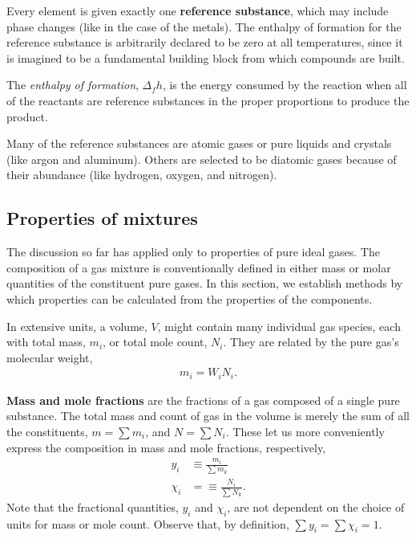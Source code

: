 Every element is given exactly one {\bf reference substance}, which may include phase changes (like in the case of the metals).  The enthalpy of formation for the reference substance is arbitrarily declared to be zero at all temperatures, since it is imagined to be a fundamental building block from which compounds are built.

The \emph{enthalpy of formation}, $\Delta_f h$, is the energy consumed by the reaction when all of the reactants are reference substances in the proper proportions to produce the product.

Many of the reference substances are atomic gases or pure liquids and crystals (like argon and aluminum).  Others are selected to be diatomic gases because of their abundance (like hydrogen, oxygen, and nitrogen).

\subsection{Properties of mixtures}

The discussion so far has applied only to properties of pure ideal gases.  The composition of a gas mixture is conventionally defined in either mass or molar quantities of the constituent pure gases.  In this section, we establish methods by which properties can be calculated from the properties of the components.  

In extensive units, a volume, $V$, might contain many individual gas species, each with total mass, $m_i$, or total mole count, $N_i$.  They are related by the pure gas's molecular weight,
\begin{align}
m_i = W_i N_i.
\end{align}

{\bf Mass and mole fractions} are the fractions of a gas composed of a single pure substance. The total mass and count of gas in the volume is merely the sum of all the constituents, $m = \sum m_i$, and $N = \sum N_i$.  These let us more conveniently express the composition in mass and mole fractions, respectively,
\begin{subequations}
\begin{align}
y_i &\equiv \frac{m_i}{\sum m_k}\\
\chi_i &= \equiv \frac{N_i}{\sum N_k}.
\end{align}
\end{subequations}
Note that the fractional quantities, $y_i$ and $\chi_i$, are not dependent on the choice of units for mass or mole count.  Observe that, by definition, $\sum y_i = \sum \chi_i = 1$.

